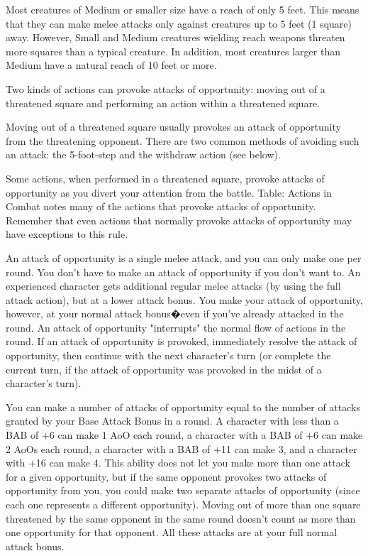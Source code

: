 Most creatures of Medium or smaller size have a reach of only 5 feet. This means that they can make melee attacks only against creatures up to 5 feet (1 square) away. However, Small and Medium creatures wielding reach weapons threaten more squares than a typical creature. In addition, most creatures larger than Medium have a natural reach of 10 feet or more.

Two kinds of actions can provoke attacks of opportunity: moving out of a threatened square and performing an action within a threatened square.

Moving out of a threatened square usually provokes an attack of opportunity from the threatening opponent. There are two common methods of avoiding such an attack: the 5-foot-step and the withdraw action (see below).

Some actions, when performed in a threatened square, provoke attacks of opportunity as you divert your attention from the battle. Table: Actions in Combat notes many of the actions that provoke attacks of opportunity. Remember that even actions that normally provoke attacks of opportunity may have exceptions to this rule.

An attack of opportunity is a single melee attack, and you can only make one per round. You don't have to make an attack of opportunity if you don't want to. An experienced character gets additional regular melee attacks (by using the full attack action), but at a lower attack bonus. You make your attack of opportunity, however, at your normal attack bonus�even if you've already attacked in the round. An attack of opportunity "interrupts" the normal flow of actions in the round. If an attack of opportunity is provoked, immediately resolve the attack of opportunity, then continue with the next character's turn (or complete the current turn, if the attack of opportunity was provoked in the midst of a character's turn).

You can make a number of attacks of opportunity equal to the number of attacks granted by your Base Attack Bonus in a round. A character with less than a BAB of +6 can make 1 AoO each round, a character with a BAB of +6 can make 2 AoOs each round, a character with a BAB of +11 can make 3, and a character with +16 can make 4. This ability does not let you make more than one attack for a given opportunity, but if the same opponent provokes two attacks of opportunity from you, you could make two separate attacks of opportunity (since each one represents a different opportunity). Moving out of more than one square threatened by the same opponent in the same round doesn't count as more than one opportunity for that opponent. All these attacks are at your full normal attack bonus.

